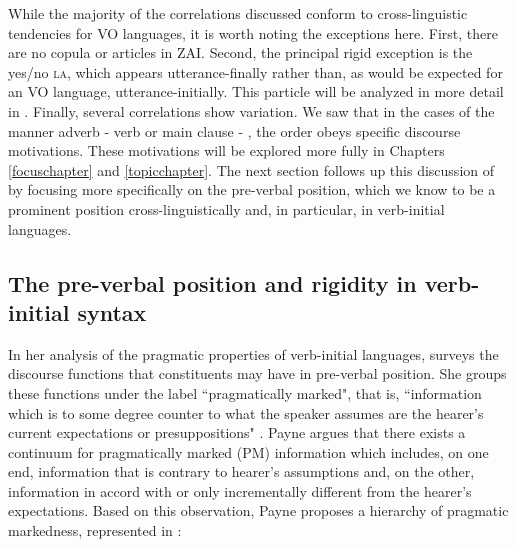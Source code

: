 While the majority of the  correlations discussed conform to cross-linguistic tendencies for VO languages, it is worth noting the exceptions here. First, there are no copula or articles in ZAI. Second, the principal rigid exception is the yes/no  \textsc{la}, which appears utterance-finally rather than, as would be expected for an VO language, utterance-initially. This particle will be analyzed in more detail in . Finally, several  correlations show variation. We saw that in the cases of the manner adverb - verb or main clause - , the order obeys specific discourse motivations. These motivations will be explored more fully in Chapters \ref{focuschapter} and \ref{topicchapter}. The next section follows up this discussion of  by focusing more specifically on the pre-verbal position, which we know to be a prominent position cross-linguistically and, in particular, in verb-initial languages.


\subsection{The pre-verbal position and rigidity in verb-initial syntax}

In her analysis of the pragmatic properties of verb-initial languages, \citet{payne1995} surveys the discourse functions that constituents may have in pre-verbal position. She groups these functions under the label ``pragmatically marked", that is, ``information which is to some degree counter to what the speaker assumes are the hearer's current expectations or presuppositions" \citep[110]{payne1995}. Payne argues that there exists a continuum for pragmatically marked (PM) information which includes, on one end, information that is contrary to hearer's assumptions and, on the other, information in accord with or only incrementally different from the hearer's expectations. Based on this observation, Payne proposes a hierarchy of pragmatic markedness, represented in :

